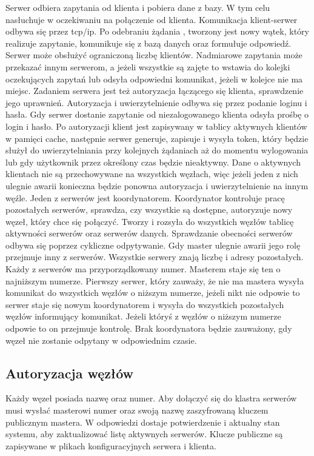 Serwer odbiera zapytania od klienta i pobiera dane z bazy. W tym celu nasłuchuje w oczekiwaniu na połączenie od klienta. Komunikacja klient-serwer odbywa się przez tcp/ip. Po odebraniu żądania , tworzony jest nowy wątek, który realizuje zapytanie, komunikuje się z bazą danych oraz formułuje odpowiedź. Serwer może obsłużyć ograniczoną liczbę klientów. Nadmiarowe zapytania może przekazać innym serwerom, a jeżeli wszystkie są zajęte to wstawia do kolejki oczekujących zapytań lub odsyła odpowiedni komunikat, jeżeli w kolejce nie ma miejsc.
Zadaniem serwera jest też autoryzacja łączącego się klienta, sprawdzenie jego uprawnień. Autoryzacja i uwierzytelnienie odbywa się przez podanie loginu i hasła. Gdy serwer dostanie zapytanie od niezalogowanego klienta odsyła prośbę o login i hasło. Po autoryzacji klient jest zapisywany w tablicy aktywnych klientów w pamięci cache, następnie serwer generuje, zapisuje i wysyła token, który będzie służył do uwierzytelniania przy kolejnych żądaniach aż do momentu wylogowania lub gdy użytkownik przez określony czas będzie nieaktywny. Dane o aktywnych klientach nie są przechowywane na wszystkich węzłach, więc jeżeli jeden z nich ulegnie awarii konieczna będzie ponowna autoryzacja i uwierzytelnienie na innym węźle.
Jeden z serwerów jest koordynatorem. Koordynator kontroluje pracę pozostałych serwerów, sprawdza, czy wszystkie są dostępne, autoryzuje nowy węzeł, który chce się połączyć. Tworzy i rozsyła do wszystkich węzłów tablicę aktywności serwerów oraz serwerów danych. Sprawdzanie obecności serwerów odbywa się poprzez cykliczne odpytywanie.
Gdy master ulegnie awarii jego rolę przejmuje inny z serwerów.
Wszystkie serwery znają liczbę i adresy pozostałych. Każdy z serwerów ma przyporządkowany numer. Masterem staje się ten o najniższym numerze. Pierwszy serwer, który zauważy, że nie ma mastera wysyła komunikat do wszystkich węzłów o niższym numerze, jeżeli nikt nie odpowie to serwer staje się nowym koordynatorem i wysyła do wszystkich pozostałych węzłów informujący komunikat. Jeżeli któryś z węzłów o niższym numerze odpowie to on przejmuje kontrolę. Brak koordynatora będzie zauważony, gdy węzeł nie zostanie odpytany w odpowiednim czasie.

\subsection{Autoryzacja węzłów}
Każdy węzeł posiada nazwę oraz numer. Aby dołączyć się do klastra serwerów musi wysłać masterowi numer oraz swoją nazwę zaszyfrowaną kluczem publicznym mastera. W odpowiedzi dostaje potwierdzenie i aktualny stan systemu, aby zaktualizować listę aktywnych serwerów.  Klucze publiczne są zapisywane w plikach konfiguracyjnych serwera i klienta.

